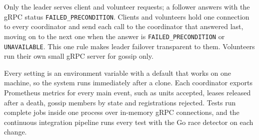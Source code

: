 Only the leader serves client and volunteer requests; a follower answers with the gRPC status \texttt{FAILED\_PRECONDITION}. Clients and volunteers hold one connection to every coordinator and send each call to the coordinator that answered last, moving on to the next one when the answer is \texttt{FAILED\_PRECONDITION} or \texttt{UNAVAILABLE}. This one rule makes leader failover transparent to them. Volunteers run their own small gRPC server for gossip only.

Every setting is an environment variable with a default that works on one machine, so the system runs immediately after a clone. Each coordinator exports Prometheus metrics for every main event, such as units accepted, leases released after a death, gossip members by state and registrations rejected. Tests run complete jobs inside one process over in-memory gRPC connections, and the continuous integration pipeline runs every test with the Go race detector on each change.
